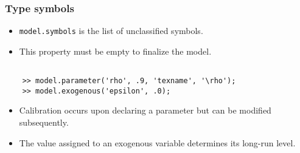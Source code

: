 \documentclass[10pt,slidestop]{beamer}
\theoremstyle{plain}
\begin{document}
\begin{frame}[c,fragile]
  \frametitle{Type symbols}

  \begin{itemize}

  \item \verb+model.symbols+ is the list of unclassified symbols.\newline

  \item This property must be empty to finalize the model.\newline

  \end{itemize}

  \begin{lstlisting}[style=MatlabConsole]

    >> model.parameter('rho', .9, 'texname', '\rho');
    >> model.exogenous('epsilon', .0);
   \end{lstlisting}

   \medskip

  \begin{itemize}

  \item Calibration occurs upon declaring a parameter but can be modified subsequently.\newline

  \item The value assigned to an exogenous variable determines its long-run level.

  \end{itemize}

\end{frame}
\end{document}
